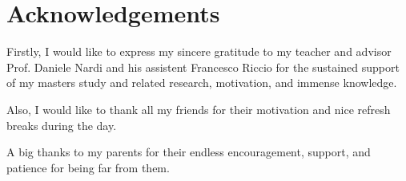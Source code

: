 
\pagestyle{fancy}
\chapter*{Acknowledgements}

Firstly, I would like to express my sincere gratitude to my teacher and advisor Prof. Daniele Nardi and his assistent Francesco Riccio for the sustained support of my masters study and related research, motivation, and immense knowledge. 

\vspace{5pt}
Also, I would like to thank all my friends for their motivation and nice refresh breaks during the day. 

\vspace{5pt}
A big thanks to my parents for their endless encouragement, support, and patience for being far from them.

\clearpage{\pagestyle{empty}\cleardoublepage}